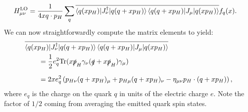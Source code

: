\documentclass[withindex,glossary]{cam-thesis}
\begin{document}
\begin{align}
H_{\mu\nu}^{\text{LO}} &= \frac{1}{4 x q \cdot p_H} \sum_{q} \overline{\braket{q(x p_H) | J_{\nu}^{\dagger} | q(q + x p_H)}\braket{q(q + x p_H) | J_{\mu} | q(x p_H) }} f_q(x).
\end{align}
We can now straightforwardly compute the matrix elements to yield:
\begin{align}
&\overline{\braket{q(x p_H) | J_{\nu}^{\dagger} | q(q + x p_H)}\braket{q(q + x p_H) | J_{\mu} | q(x p_H) }} \notag\\
&\qquad= \frac{1}{2} e_q^2 \textrm{Tr}(x \slashed{p}_H \gamma_{\nu} (\slashed{q} + x \slashed{p}_H) \gamma_{\mu}) \\[1.5ex]
&\qquad = 2x e_q^2 \left( p_{H\nu} (q + x p_H)_{\mu} + p_{H\mu} (q + x p_H)_{\nu} - \eta_{\mu\nu} p_H \cdot (q + x p_H) \right),\notag
\end{align}
where $e_q$ is the charge on the quark $q$ in units of the electric charge $e$. Note the factor of $1/2$ coming from averaging the emitted quark spin states.
\end{document}
